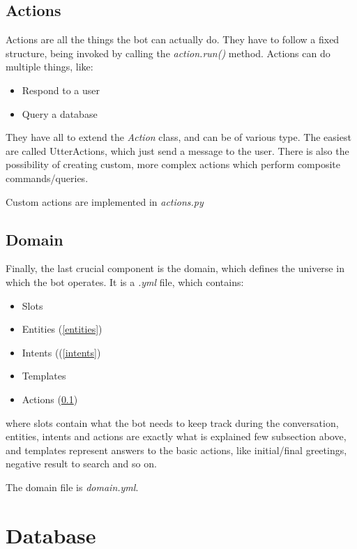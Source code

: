 \documentclass[11pt,a4paper]{article}
\begin{document}
	\subsection{Actions}
	\label{actions}
	
	Actions are all the things the bot can actually do. They have to follow a fixed structure, being invoked by calling the \textit{action.run()} method. Actions can do multiple things, like:
		
		\begin{itemize}
			\item Respond to a user
			\item Query a database
		\end{itemize}

	They have all to extend the \textit{Action} class, and can be of various type. The easiest are called UtterActions, which just send a message to the user. There is also the possibility of creating custom, more complex actions which perform composite commands/queries. 
	
	Custom actions are implemented in \textit{actions.py}
	
	\subsection{Domain}
		Finally, the last crucial component is the domain, which defines the universe in which the bot operates. It is a \textit{.yml} file, which contains:
		\begin{itemize}
			\item Slots
			\item Entities (\ref{entities})
			\item Intents ((\ref{intents})
			\item Templates 
			\item Actions (\ref{actions})
		\end{itemize}

where slots contain what the bot needs to keep track during the conversation, entities, intents and actions are exactly what is explained few subsection above, and templates represent answers to the basic actions, like initial/final greetings, negative result to search and so on.

The domain file is \textit{domain.yml}.
	
\section{Database}
 
\end{document}

